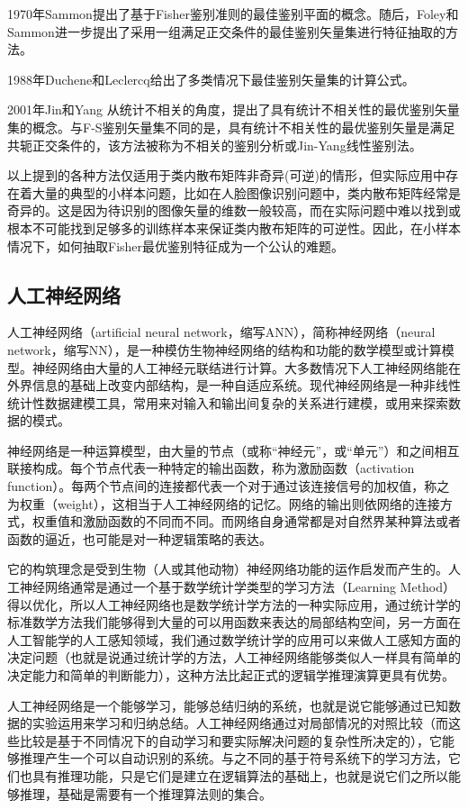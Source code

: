\documentclass[11pt,a4paper,twoside]{book}
\begin{document}
1970年Sammon提出了基于Fisher鉴别准则的最佳鉴别平面的概念。随后，Foley和Sammon进一步提出了采用一组满足正交条件的最佳鉴别矢量集进行特征抽取的方法。

1988年Duchene和Leclercq给出了多类情况下最佳鉴别矢量集的计算公式。

2001年Jin和Yang 从统计不相关的角度，提出了具有统计不相关性的最优鉴别矢量集的概念。与F-S鉴别矢量集不同的是，具有统计不相关性的最优鉴别矢量是满足共轭正交条件的，该方法被称为不相关的鉴别分析或Jin-Yang线性鉴别法。 

以上提到的各种方法仅适用于类内散布矩阵非奇异(可逆)的情形，但实际应用中存在着大量的典型的小样本问题，比如在人脸图像识别问题中，类内散布矩阵经常是奇异的。这是因为待识别的图像矢量的维数一般较高，而在实际问题中难以找到或根本不可能找到足够多的训练样本来保证类内散布矩阵的可逆性。因此，在小样本情况下，如何抽取Fisher最优鉴别特征成为一个公认的难题。

\subsection{人工神经网络}
人工神经网络（artificial neural network，缩写ANN），简称神经网络（neural network，缩写NN），是一种模仿生物神经网络的结构和功能的数学模型或计算模型。神经网络由大量的人工神经元联结进行计算。大多数情况下人工神经网络能在外界信息的基础上改变内部结构，是一种自适应系统。现代神经网络是一种非线性统计性数据建模工具，常用来对输入和输出间复杂的关系进行建模，或用来探索数据的模式。

神经网络是一种运算模型，由大量的节点（或称“神经元”，或“单元”）和之间相互联接构成。每个节点代表一种特定的输出函数，称为激励函数（activation function）。每两个节点间的连接都代表一个对于通过该连接信号的加权值，称之为权重（weight），这相当于人工神经网络的记忆。网络的输出则依网络的连接方式，权重值和激励函数的不同而不同。而网络自身通常都是对自然界某种算法或者函数的逼近，也可能是对一种逻辑策略的表达。

它的构筑理念是受到生物（人或其他动物）神经网络功能的运作启发而产生的。人工神经网络通常是通过一个基于数学统计学类型的学习方法（Learning Method）得以优化，所以人工神经网络也是数学统计学方法的一种实际应用，通过统计学的标准数学方法我们能够得到大量的可以用函数来表达的局部结构空间，另一方面在人工智能学的人工感知领域，我们通过数学统计学的应用可以来做人工感知方面的决定问题（也就是说通过统计学的方法，人工神经网络能够类似人一样具有简单的决定能力和简单的判断能力），这种方法比起正式的逻辑学推理演算更具有优势。

人工神经网络是一个能够学习，能够总结归纳的系统，也就是说它能够通过已知数据的实验运用来学习和归纳总结。人工神经网络通过对局部情况的对照比较（而这些比较是基于不同情况下的自动学习和要实际解决问题的复杂性所决定的），它能够推理产生一个可以自动识别的系统。与之不同的基于符号系统下的学习方法，它们也具有推理功能，只是它们是建立在逻辑算法的基础上，也就是说它们之所以能够推理，基础是需要有一个推理算法则的集合。
\end{document}
